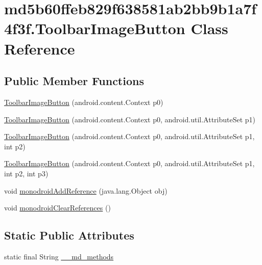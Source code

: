 \hypertarget{classmd5b60ffeb829f638581ab2bb9b1a7f4f3f_1_1_toolbar_image_button}{
\section{md5b60ffeb829f638581ab2bb9b1a7f4f3f.ToolbarImageButton Class Reference}
\label{classmd5b60ffeb829f638581ab2bb9b1a7f4f3f_1_1_toolbar_image_button}
}
\subsection*{Public Member Functions}
\begin{CompactItemize}
\item 
\hyperlink{classmd5b60ffeb829f638581ab2bb9b1a7f4f3f_1_1_toolbar_image_button_5b82e6fb711d83ddca88b91ff6a3fac3}{ToolbarImageButton} (android.content.Context p0)
\item 
\hyperlink{classmd5b60ffeb829f638581ab2bb9b1a7f4f3f_1_1_toolbar_image_button_e32a9e49a9fa0aa0435c1f35ef1f08a5}{ToolbarImageButton} (android.content.Context p0, android.util.AttributeSet p1)
\item 
\hyperlink{classmd5b60ffeb829f638581ab2bb9b1a7f4f3f_1_1_toolbar_image_button_ea3b6b5b763a9df42845f08ae1587edc}{ToolbarImageButton} (android.content.Context p0, android.util.AttributeSet p1, int p2)
\item 
\hyperlink{classmd5b60ffeb829f638581ab2bb9b1a7f4f3f_1_1_toolbar_image_button_8927daf324fde7412a4fbef5898d7d91}{ToolbarImageButton} (android.content.Context p0, android.util.AttributeSet p1, int p2, int p3)
\item 
void \hyperlink{classmd5b60ffeb829f638581ab2bb9b1a7f4f3f_1_1_toolbar_image_button_11accc7abc6a78cc08dc6f299d74ad94}{monodroidAddReference} (java.lang.Object obj)
\item 
void \hyperlink{classmd5b60ffeb829f638581ab2bb9b1a7f4f3f_1_1_toolbar_image_button_584b37224644170816eb54f59c59945c}{monodroidClearReferences} ()
\end{CompactItemize}
\subsection*{Static Public Attributes}
\begin{CompactItemize}
\item 
static final String \hyperlink{classmd5b60ffeb829f638581ab2bb9b1a7f4f3f_1_1_toolbar_image_button_581edb38bbe374fe7d3ceed23ee694df}{\_\-\_\-md\_\-methods}
\end{CompactItemize}
